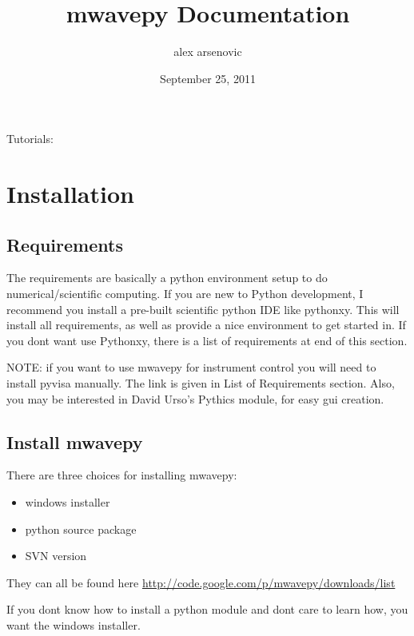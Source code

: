 \documentclass[letterpaper,10pt,english]{sphinxmanual}
\title{mwavepy Documentation}
\date{September 25, 2011}
\author{alex arsenovic}
\begin{document}
\maketitle
\tableofcontents
{}\label{index::doc}


Tutorials:


\chapter{Installation}
\label{installation:mwavepy-s-documentation}\label{installation::doc}\label{installation:installation}\label{installation:id1}

\section{Requirements}
\label{installation:requirements}
The requirements are basically a python environment setup to do numerical/scientific computing. If you are new to Python development, I recommend you install a pre-built scientific python IDE like pythonxy. This will install all requirements, as well as provide a nice environment to get started in. If you dont want use Pythonxy, there is a list of requirements at end of this section.

NOTE: if you want to use mwavepy for instrument control you will need to install pyvisa manually. The link is given in List of Requirements section. Also, you may be interested in David Urso's Pythics module, for easy gui creation.


\section{Install mwavepy}
\label{installation:install-mwavepy}
There are three choices for installing mwavepy:
\begin{itemize}
\item {} 
windows installer

\item {} 
python source package

\item {} 
SVN version

\end{itemize}

They can all be found here \href{http://code.google.com/p/mwavepy/downloads/list}{http://code.google.com/p/mwavepy/downloads/list}

If you dont know how to install a python module and dont care to learn how, you want the windows installer.
\end{document}
